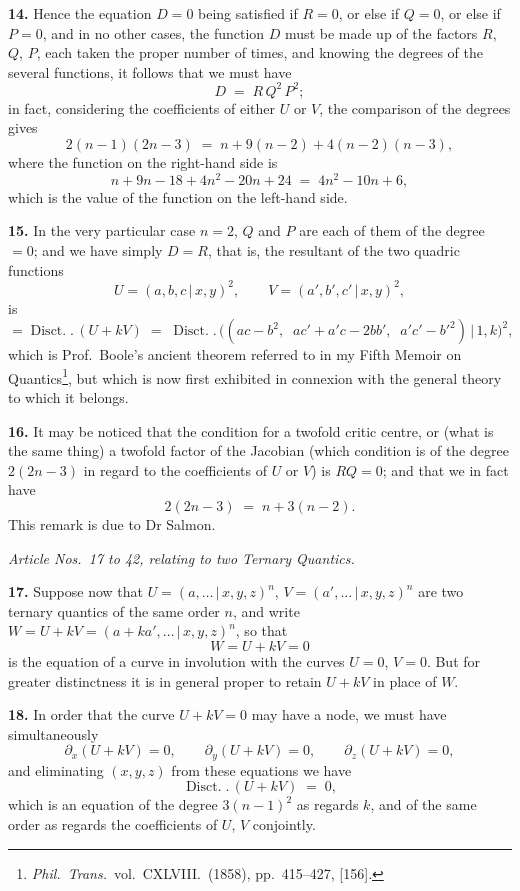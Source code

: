 \documentclass[11pt,a4paper]{article}
\providecommand{\mid}{\,|\,}
\providecommand{\Disct}{\operatorname{Disct.}}
\begin{document}
\medskip

\textbf{14.} Hence the equation $D = 0$ being satisfied if $R = 0$, or else if $Q = 0$, or else if $P = 0$, and in no other cases, the function $D$ must be made up of the factors $R$, $Q$, $P$, each taken the proper number of times, and knowing the degrees of the several functions, it follows that we must have
\[
D \;=\; R\,Q^2\,P^2;
\]
in fact, considering the coefficients of either $U$ or $V$, the comparison of the degrees gives
\[
2(n-1)(2n-3) \;=\; n + 9(n-2) + 4(n-2)(n-3),
\]
where the function on the right-hand side is
\[
n + 9n - 18 + 4n^2 - 20n + 24 \;=\; 4n^2 - 10n + 6,
\]
which is the value of the function on the left-hand side.

\medskip

\textbf{15.} In the very particular case $n = 2$, $Q$ and $P$ are each of them of the degree $= 0$; and we have simply $D = R$, that is, the resultant of the two quadric functions
\[
U = (a, b, c \mid x, y)^2,\qquad V = (a', b', c' \mid x, y)^2,
\]
is
\[
= \Disct.\,(U + kV) \;=\; \Disct.\,\bigl((ac - b^2,\;\; ac' + a'c - 2bb',\;\; a'c' - b'^2)\mid 1, k\bigr)^2,
\]
which is Prof.\ Boole's ancient theorem referred to in my Fifth Memoir on Quantics\footnote{\textit{Phil.\ Trans.}\ vol.~CXLVIII.\ (1858), pp.~415--427, [156].}, but which is now first exhibited in connexion with the general theory to which it belongs.

\medskip

\textbf{16.} It may be noticed that the condition for a twofold critic centre, or (what is the same thing) a twofold factor of the Jacobian (which condition is of the degree $2(2n - 3)$ in regard to the coefficients of $U$ or $V$) is $RQ = 0$; and that we in fact have
\[
2(2n - 3) \;=\; n + 3(n - 2).
\]
This remark is due to Dr Salmon.

\begin{center}
\textit{Article Nos.~17 to 42, relating to two Ternary Quantics.}
\end{center}

\textbf{17.} Suppose now that $U = (a, \ldots \mid x, y, z)^n$, $V = (a', \ldots \mid x, y, z)^n$ are two ternary quantics of the same order $n$, and write $W = U + kV = (a + ka', \ldots \mid x, y, z)^n$, so that
\[
W = U + kV = 0
\]
is the equation of a curve in involution with the curves $U = 0$, $V = 0$. But for greater distinctness it is in general proper to retain $U + kV$ in place of $W$.

\medskip

\textbf{18.} In order that the curve $U + kV = 0$ may have a node, we must have simultaneously
\[
\partial_x(U + kV) = 0,\qquad \partial_y(U + kV) = 0,\qquad \partial_z(U + kV) = 0,
\]
and eliminating $(x, y, z)$ from these equations we have
\[
\Disct.\,(U + kV) \;=\; 0,
\]
which is an equation of the degree $3(n - 1)^2$ as regards $k$, and of the same order as regards the coefficients of $U$, $V$ conjointly.
\end{document}
